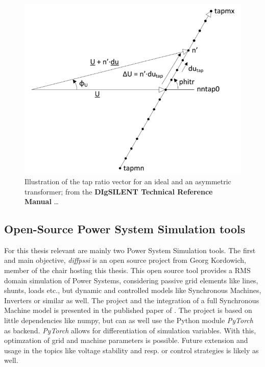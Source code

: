\begin{figure}[htb!]
        \centering
        \includegraphics[width=.7\linewidth]{images/modeling/asymetric_ratio_vector.png}
        \caption[Illustration of the tap ratio vector for an ideal and an asymmetric transformer]{Illustration of the tap ratio vector for an ideal and an asymmetric transformer; from the \textcolor{ees_red}{\textbf{DIgSILENT Technical Reference Manual}} \dots \quelle}
        \label{fig:asymetric-ratio-vector}
\end{figure}

\subsection{Open-Source Power System Simulation tools}
\label{sec:simulation-tools}

For this thesis relevant are mainly two Power System Simulation tools.
The first and main objective, \textit{diffpssi} is an open source project from Georg Kordowich, member of the chair hosting this thesis.
This open source tool provides a \acs{RMS} domain simulation of Power Systems, considering passive grid elements like lines, shunts, loads etc., but dynamic and controlled models like Synchronous Machines, Inverters or similar as well.
The project and the integration of a full Synchronous Machine model is presented in the published paper of \textcite{kordowich_2023}.
The project is based on little dependencies like numpy, but can as well use the Python module \textit{PyTorch} as backend.
\textit{PyTorch} allows for differentiation of simulation variables.
With this, optimzation of grid and machine parameters is possible.
Future extension and usage in the topics like voltage stability and resp. or control strategies is likely as well.

